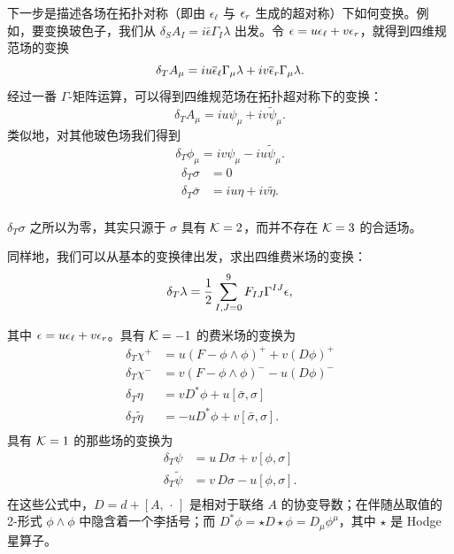 下一步是描述各场在拓扑对称（即由 $\epsilon_\ell$ 与 $\epsilon_r$ 生成的超对称）下如何变换。例如，要变换玻色子，我们从 $\delta_S A_I=i\bar\epsilon\Gamma_I\lambda$ 出发。令 $\epsilon=u\epsilon_\ell+v\epsilon_r$，就得到四维规范场的变换 %
\setcounter{equation}{21}
\begin{equation}\label{eq:kono}
\delta_T A_\mu = iu\overline \epsilon_\ell
\Gamma_\mu \lambda +iv\overline\epsilon_r\Gamma_\mu\lambda.
\end{equation}
经过一番 $\Gamma$-矩阵运算，可以得到四维规范场在拓扑超对称下的变换： %
\setcounter{equation}{22}
\begin{equation}\label{eq:bono}
\delta_T A_\mu=iu
\psi_\mu+iv\tilde\psi_\mu.
\end{equation}
类似地，对其他玻色场我们得到 %
\setcounter{equation}{23}
\begin{equation}\label{eq:lono}
\delta_T\phi_\mu=iv\psi_\mu -
iu\tilde\psi_\mu.
\end{equation}
\setcounter{equation}{24}
\begin{equation}\label{eq:otono}
\begin{aligned}\delta_T\sigma & = 0 \\
                       \delta_T\bar\sigma & = iu\eta+iv\tilde\eta.\\\end{aligned}
\end{equation}

$\delta_T\sigma$ 之所以为零，其实只源于 $\sigma$ 具有 ${{\mathcal{K}}}=2$，而并不存在 ${{\mathcal{K}}}=3$ 的合适场。

同样地，我们可以从基本的变换律出发，求出四维费米场的变换：
\setcounter{equation}{25}
\begin{equation}\label{eq:invo}
\delta_T\lambda=\frac{1}{2}\sum_{I,J=0}^9F_{IJ}\Gamma^{IJ}\epsilon,
\end{equation}

其中 $\epsilon=u\epsilon_\ell+v\epsilon_r$。具有 ${{\mathcal{K}}}=-1$ 的费米场的变换为
\setcounter{equation}{26}
\begin{equation}\label{eq:helpme}
\begin{aligned}\delta_T\chi^+ & = u(F-\phi\wedge\phi)^+
+v(D\phi)^+\\ \delta_T\chi^-& = v(F-\phi\wedge\phi)^- -
u(D\phi)^-\\ \delta_T\eta& = vD^*\phi+u[\bar\sigma,\sigma] \\
\delta_T\tilde\eta& = -uD^* \phi+v[\bar\sigma,\sigma].\\\end{aligned}
\end{equation}
具有 ${{\mathcal{K}}}=1$ 的那些场的变换为 %
\setcounter{equation}{27}
\begin{equation}\label{eq:mimo}
\begin{aligned}\delta_T\psi& = u\,
D\sigma +v[\phi,\sigma]\\ \delta_T\tilde\psi & = v\, D\sigma - u
[\phi,\sigma].\\\end{aligned}
\end{equation}
在这些公式中，$D=d+[A,\,\cdot \,]$ 是相对于联络 $A$ 的协变导数；在伴随丛取值的 2-形式 $\phi\wedge\phi$ 中隐含着一个李括号；而 $D^*\phi=\star D \star \phi=D_\mu\phi^\mu$，其中 $\star$ 是 Hodge 星算子。
